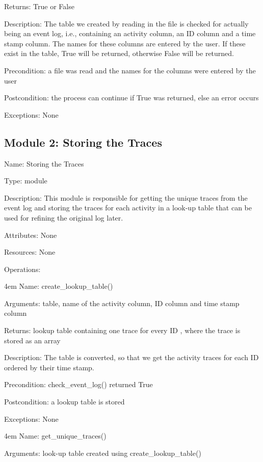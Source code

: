 \documentclass[notitlepage]{article}
\begin{document}
\begin{flushleft}
Returns: True or False

Description: The table we created by reading in the file is checked for actually being an event log, i.e., containing an activity column, an ID column and a time stamp column. The names for these columns are entered by the user. If these exist in the table, True will be returned, otherwise False will be returned. 

Precondition: a file was read and the names for the columns were entered by the user

Postcondition: the process can continue if True was returned, else an error occurs

Exceptions: None
\par
\endgroup


\subsection{Module 2: Storing the Traces}
Name: Storing the Traces

Type: module

Description: This module is responsible for getting the unique traces from the event log and storing the traces for each activity in a look-up table that can be used for refining the original log later. 

Attributes: None

Resources: None

Operations: 
\medskip

\par
\begingroup
\leftskip4em
Name: create\_lookup\_table()

Arguments: table,  name of the activity column, ID column and time stamp column

Returns: lookup table containing one trace for every ID , where the trace is stored as an array

Description: The table is converted, so that we get the activity traces for each ID ordered by their time stamp.

Precondition: check\_event\_log() returned True

Postcondition: a lookup table is stored

Exceptions: None

\par
\endgroup

\medskip

\par
\begingroup
\leftskip4em
Name: get\_unique\_traces()

Arguments: look-up table created using create\_lookup\_table()


\end{flushleft}
\end{document}
